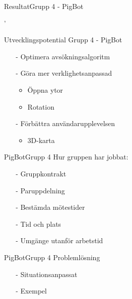 \begin{frame}{Resultat}{Grupp 4 - PigBot}
\begin{center}
 '
\end {center}
\end{frame}


\begin{frame}{Utvecklingspotential }{Grupp 4 - PigBot}

  \begin{itemize}
    \item[-] Optimera avsökningsalgoritm
    \item[-] Göra mer verklighetsanpassad
	\begin{itemize}
	  \item Öppna ytor
	  \item Rotation
	\end{itemize}	
    \item[-] Förbättra användarupplevelsen
     	\begin{itemize}
	  \item 3D-karta
	\end{itemize}
   \end{itemize}
\end{frame}


\begin{frame}[fragile]{PigBot}{Grupp 4}
Hur gruppen har jobbat:
  \begin{itemize}
 \pause
    \item[-] Gruppkontrakt 
\pause
    \item[-] Paruppdelning
\pause
    \item[-] Bestämda mötestider
\pause
    \item[-] Tid och plats
\pause
    \item[-] Umgänge utanför arbetstid
  \end{itemize}
\end{frame}

\begin{frame}[fragile]{PigBot}{Grupp 4}
Problemlösning
  \begin{itemize}
 \pause
    \item[-] Situationsanpassat
\pause
    \item[-] Exempel
  \end{itemize}
\end{frame}

